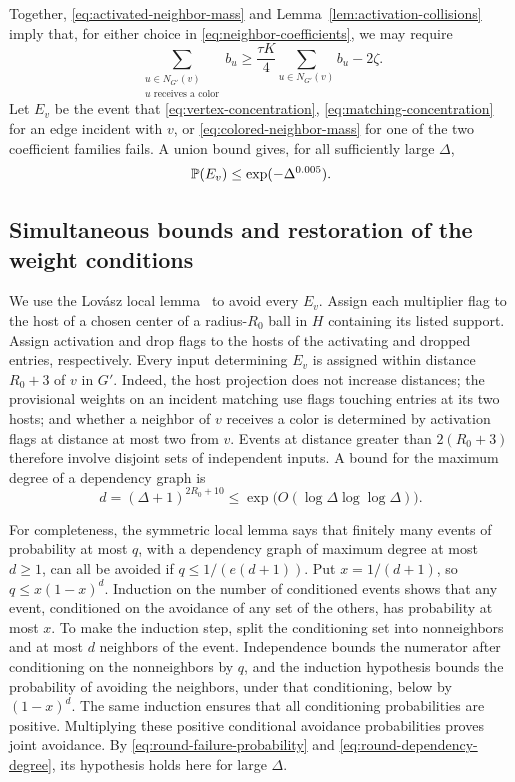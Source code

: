 Together, \eqref{eq:activated-neighbor-mass} and
Lemma~\ref{lem:activation-collisions} imply that, for either choice
in \eqref{eq:neighbor-coefficients}, we may require
\begin{equation}\label{eq:colored-neighbor-mass}
 \sum_{\substack{u\in N_{G'}(v)\\u\text{ receives a color}}}b_u
 \ge\frac{\tau K}{4}\sum_{u\in N_{G'}(v)}b_u-2\zeta.
\end{equation}
Let $E_v$ be the event that \eqref{eq:vertex-concentration},
\eqref{eq:matching-concentration} for an edge incident with $v$, or
\eqref{eq:colored-neighbor-mass} for one of the two coefficient
families fails.  A union bound gives, for all sufficiently large
$\Delta$,
\begin{equation}\label{eq:round-failure-probability}
 \mathbb P(E_v)\le\exp(-\Delta^{0.005}).
\end{equation}

\subsection{Simultaneous bounds and restoration of the weight conditions}

We use the Lov\'asz local lemma~\cite{ErdosLovasz1975} to avoid every
$E_v$.  Assign each multiplier flag to the host of a chosen center of
a radius-$R_0$ ball in $H$ containing its listed support.  Assign
activation and drop flags to the hosts of the activating and dropped
entries, respectively.  Every input determining $E_v$ is assigned
within distance $R_0+3$ of $v$ in $G'$.  Indeed, the host projection
does not increase distances; the provisional weights on an incident
matching use flags touching entries at its two hosts; and whether
a neighbor of $v$ receives a color is determined by activation flags
at distance at most two from $v$.  Events at distance greater than
$2(R_0+3)$ therefore involve disjoint sets of independent inputs.
A bound for the maximum degree of a dependency graph is
\begin{equation}\label{eq:round-dependency-degree}
 d=(\Delta+1)^{2R_0+10}
   \le\exp\bigl(O(\log\Delta\log\log\Delta)\bigr).
\end{equation}

For completeness, the symmetric local lemma says that finitely many
events of probability at most $q$, with a dependency graph of maximum
degree at most $d\ge1$, can all be avoided if
$q\le1/(e(d+1))$.  Put $x=1/(d+1)$, so
$q\le x(1-x)^d$.  Induction on the number of conditioned events shows
that any event, conditioned on the avoidance of any set of the others,
has probability at most $x$.  To make the induction step, split the
conditioning set into nonneighbors and at most $d$ neighbors of the
event.  Independence bounds the numerator after conditioning on the
nonneighbors by $q$, and the induction hypothesis bounds the
probability of avoiding the neighbors, under that conditioning, below
by $(1-x)^d$.  The same induction ensures that all conditioning
probabilities are positive.  Multiplying these positive conditional
avoidance probabilities proves joint avoidance.  By
\eqref{eq:round-failure-probability} and
\eqref{eq:round-dependency-degree}, its hypothesis holds here for
large $\Delta$.

